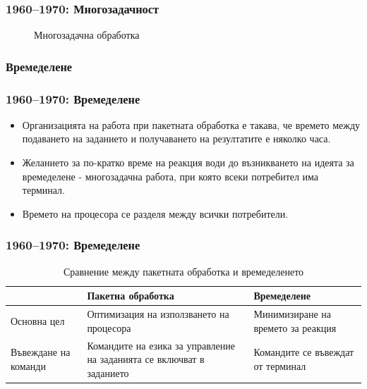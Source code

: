\documentclass[ignorenonframetext, hyperref=unicode]{beamer}
\begin{document}
\begin{frame}
\frametitle{1960--1970: Многозадачност}
\begin{figure}
\center
{}
\caption{Многозадачна обработка}
\end{figure}
\end{frame}


\subsubsection{Времеделене}

\begin{frame}
\frametitle{1960--1970: Времеделене}
\begin{itemize}
  \item Организацията на работа при пакетната обработка е такава, че времето
  между подаването на заданието и получаването на резултатите е няколко часа.
  \item Желанието за по-кратко време на реакция води до възникването на идеята
  за времеделене - многозадачна работа, при която всеки потребител има терминал.
  \item Времето на процесора се разделя между всички потребители.
\end{itemize}
\end{frame}


\begin{frame}
\frametitle{1960--1970: Времеделене}
\begin{table}
\begin{supertabular}{|p{0.15\textwidth}|p{0.35\textwidth}|p{0.35\textwidth}|}
\hline
\ & Пакетна обработка & Времеделене \\
\hline
Основна цел & 
Оптимизация на използването на процесора &
Минимизиране на времето за реакция \\
\hline
Въвеждане на команди &
Командите на езика за управление на заданията се  включват в заданието &
Командите се въвеждат от терминал\\
\hline
\end{supertabular}
\caption{Сравнение между пакетната обработка и времеделенето}
\end{table}
\end{frame}
\end{document}

